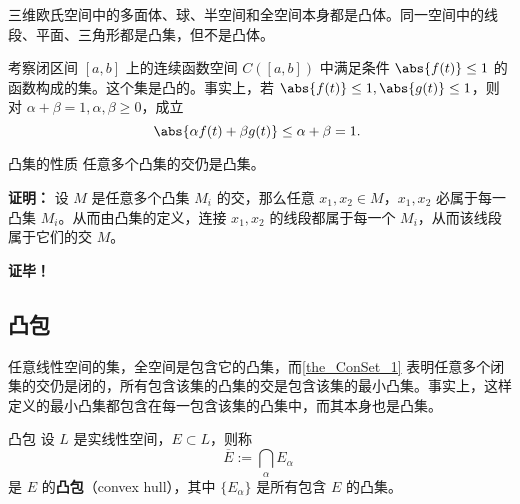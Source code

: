 \begin{example}{}
三维欧氏空间中的多面体、球、半空间和全空间本身都是凸体。同一空间中的线段、平面、三角形都是凸集，但不是凸体。
\end{example}

\begin{example}{}
考察闭区间 $[a,b]$ 上的连续函数空间 $C([a,b])$ 中满足条件 $\abs{f(t)}\leq1$ 的函数构成的集。这个集是凸的。事实上，若 $\abs{f(t)}\leq1,\abs{g(t)}\leq1$，则对 $\alpha+\beta=1,\alpha,\beta\geq0$，成立
\begin{equation}
\abs{\alpha f(t)+\beta g(t)}\leq\alpha+\beta=1.~
\end{equation}

\end{example}




\begin{theorem}{凸集的性质}\label{the_ConSet_1}
任意多个凸集的交仍是凸集。
\end{theorem}
\textbf{证明：} 设 $M$ 是任意多个凸集 $M_i$ 的交，那么任意 $x_1,x_2\in M$，$x_1,x_2$ 必属于每一凸集 $M_i$。从而由凸集的定义，连接 $x_1,x_2$ 的线段都属于每一个 $M_i$，从而该线段属于它们的交 $M$。

\textbf{证毕！} 

\subsection{凸包}
任意线性空间的集，全空间是包含它的凸集，而\autoref{the_ConSet_1} 表明任意多个闭集的交仍是闭的，所有包含该集的凸集的交是包含该集的最小凸集。事实上，这样定义的最小凸集都包含在每一包含该集的凸集中，而其本身也是凸集。
\begin{definition}{凸包}
设 $L$ 是实线性空间，$E\subset L$，则称
\begin{equation}
\overline{E}:=\bigcap_{\alpha}E_\alpha~
\end{equation}
是 $E$ 的\textbf{凸包}（convex hull），其中 $\{E_\alpha\}$ 是所有包含 $E$ 的凸集。
\end{definition}






















